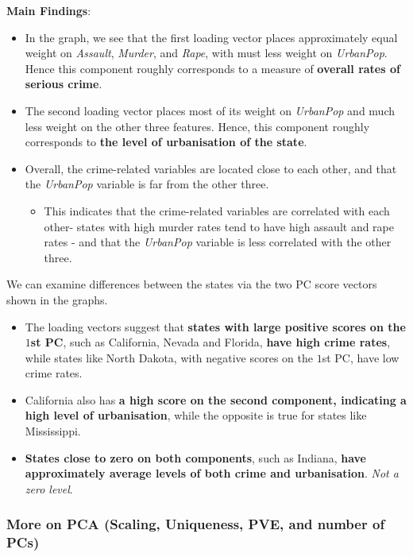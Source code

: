 \documentclass[11pt]{article}
\begin{document}
\noindent \textbf{Main Findings}:
\begin{itemize}
    \item In the graph, we see that the first loading vector places approximately equal weight on \textit{Assault}, \textit{Murder}, and \textit{Rape}, with must less weight on \textit{UrbanPop}. Hence this component roughly corresponds to a measure of \textbf{overall rates of serious crime}.
    \item The second loading vector places most of its weight on \textit{UrbanPop} and much less weight on the other three features. Hence, this component roughly corresponds to \textbf{the level of urbanisation of the state}.
    \item Overall, the crime-related variables are located close to each other, and that the \textit{UrbanPop} variable is far from the other three.
        \begin{itemize}
            \item This indicates that the crime-related variables are correlated with each other- states with high murder rates tend to have high assault and rape rates - and that the \textit{UrbanPop} variable is less correlated with the other three.
        \end{itemize}
\end{itemize} \phantom{i}

\noindent We can examine differences between the states via the two PC score vectors shown in the graphs.
\begin{itemize}
    \item The loading vectors suggest that \textbf{states with large positive scores on the $1$st PC}, such as California, Nevada and Florida, \textbf{have high crime rates}, while states like North Dakota, with negative scores on the $1$st PC, have low crime rates.
    \item California also has \textbf{a high score on the second component, indicating a high level of urbanisation}, while the opposite is true for states like Mississippi.
    \item \textbf{States close to zero on both components}, such as Indiana, \textbf{have approximately average levels of both crime and urbanisation}. \textit{Not a zero level}.
\end{itemize}

\subsubsection{More on PCA (Scaling, Uniqueness, PVE, and number of PCs)}
\end{document}
